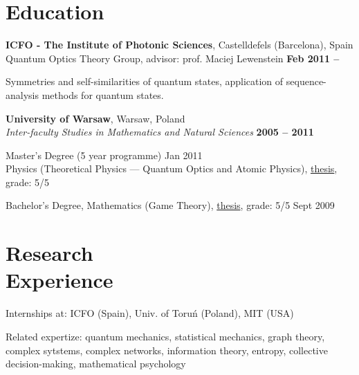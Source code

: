 \documentclass[margin,line]{resume}
\begin{document}
\begin{resume}
    \section{\mysidestyle Education}
    
    {\bf ICFO - The Institute of Photonic Sciences},  Castelldefels (Barcelona), Spain \\%
    Quantum Optics Theory Group, advisor: prof. Maciej Lewenstein \hfill {\bf Feb 2011 -- }\\
   \begin{list2}
        \vspace*{-4mm}
        \item Symmetries and self-similarities of quantum states, application of sequence-analysis methods for quantum states.
    \end{list2}

    {\bf University of Warsaw}, Warsaw, Poland \\
    {\sl Inter-faculty Studies in Mathematics and Natural Sciences} \hfill {\bf 2005 -- 2011}\\
    \begin{list2}
      \vspace*{-4mm}
      \item Master's Degree  (5 year programme) {\hfill Jan 2011}\\
      Physics (Theoretical Physics --- Quantum Optics and Atomic Physics),
      \href{http://migdal.wikidot.com/en:collective-decoherence}{thesis}, grade: 5/5
      \item Bachelor's Degree, Mathematics (Game Theory),
      \href{http://migdal.wikidot.com/en:mafia}{thesis}, grade: 5/5 \hfill Sept 2009
    \end{list2}
    
\vspace{3mm}

    \section{\mysidestyle Research\\Experience}

    Internships at: ICFO (Spain), Univ. of Toruń (Poland), MIT (USA)

    Related expertize: quantum mechanics, statistical mechanics, graph theory, complex sytstems, complex networks, information theory, entropy, collective decision-making, mathematical psychology


\end{resume}
\end{document}
